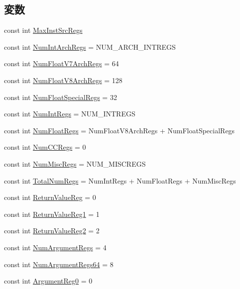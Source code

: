 \subsection*{変数}
\begin{DoxyCompactItemize}
\item 
const int \hyperlink{namespaceArmISA_a520799fb7436e81cf66cbad7b420b833}{MaxInstSrcRegs}
\item 
const int \hyperlink{namespaceArmISA_a405c0abe85dc0da846c120e3b31f375c}{NumIntArchRegs} = NUM\_\-ARCH\_\-INTREGS
\item 
const int \hyperlink{namespaceArmISA_ac5bd0125daa93dac8dfda6a9fcd0fdf7}{NumFloatV7ArchRegs} = 64
\item 
const int \hyperlink{namespaceArmISA_addf5228857ac9ae7ac9d4f1fb64822d1}{NumFloatV8ArchRegs} = 128
\item 
const int \hyperlink{namespaceArmISA_a49908eb80616530afc519599ec46e42e}{NumFloatSpecialRegs} = 32
\item 
const int \hyperlink{namespaceArmISA_a9c412b5118ce369570c156c4e156638a}{NumIntRegs} = NUM\_\-INTREGS
\item 
const int \hyperlink{namespaceArmISA_a627b25288f2452be107872a138df8b85}{NumFloatRegs} = NumFloatV8ArchRegs + NumFloatSpecialRegs
\item 
const int \hyperlink{namespaceArmISA_a717317b863009b3e1b683c3bdddb9fd3}{NumCCRegs} = 0
\item 
const int \hyperlink{namespaceArmISA_a568d4aa96dd7cd963f3b1b1b0446c9c6}{NumMiscRegs} = NUM\_\-MISCREGS
\item 
const int \hyperlink{namespaceArmISA_a578a3508d56f10e933ba9559e2cf907c}{TotalNumRegs} = NumIntRegs + NumFloatRegs + NumMiscRegs
\item 
const int \hyperlink{namespaceArmISA_a472eedbcba9726645062b921f8d07e98}{ReturnValueReg} = 0
\item 
const int \hyperlink{namespaceArmISA_ade3313e5aa950e905a4abfcddb8b586f}{ReturnValueReg1} = 1
\item 
const int \hyperlink{namespaceArmISA_a79f92ed8bb02fb567017daeaf211dddf}{ReturnValueReg2} = 2
\item 
const int \hyperlink{namespaceArmISA_afce5b087d1b866c8f91317e6ddbe62dd}{NumArgumentRegs} = 4
\item 
const int \hyperlink{namespaceArmISA_a768167159a50d7c5de68d791118d8255}{NumArgumentRegs64} = 8
\item 
const int \hyperlink{namespaceArmISA_a94fc8e5760c62d7817856f02a1be3cb4}{ArgumentReg0} = 0
\item 

\end{DoxyCompactItemize}
